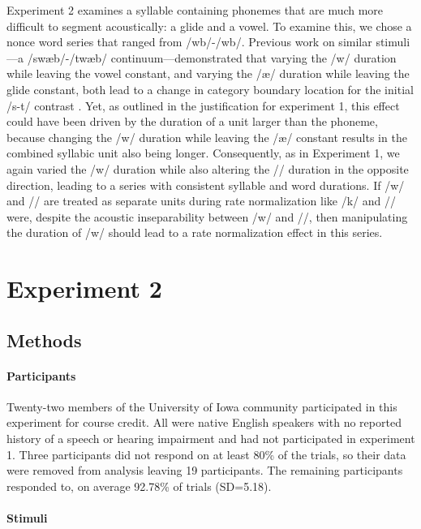 \documentclass[preprint]{JASA}
\begin{document}
Experiment 2 examines a syllable containing phonemes that are much more difficult to segment acoustically: a glide and a vowel. To examine this, we chose a nonce word series that ranged from /\textesh w\textsci b/-/\textteshlig w\textsci b/. Previous work on similar stimuli---a /sw\ae b/-/tw\ae b/ continuum---demonstrated that varying the /w/ duration while leaving the vowel constant, and varying the /\ae/ duration while leaving the glide constant, both lead to a change in category boundary location for the initial /s-t/ contrast \citep{newmanPerceptualNormalizationSpeaking1996}. Yet, as outlined in the justification for experiment 1, this effect could have been driven by the duration of a unit larger than the phoneme, because changing the /w/ duration while leaving the /\ae/ constant results in the combined syllabic unit also being longer. Consequently, as in Experiment 1, we again varied the /w/ duration while also altering the /\textsci/ duration in the opposite direction, leading to a series with consistent syllable and word durations. If /w/ and /\textsci/ are treated as separate units during rate normalization like /k/ and /\textscripta/ were, despite the acoustic inseparability between /w/ and /\textsci/, then manipulating the duration of /w/ should lead to a rate normalization effect in this series. 

\section{Experiment 2}\label{exp2}

\subsection{Methods}

\paragraph{Participants}

Twenty-two members of the University of Iowa community participated in this experiment for course credit. All were native English speakers with no reported history of a speech or hearing impairment and had not participated in experiment 1. Three participants did not respond on at least 80\% of the trials, so their data were removed from analysis leaving 19 participants. The remaining participants responded to, on average 92.78\% of trials (SD=5.18). 

\paragraph{Stimuli}
\end{document}
